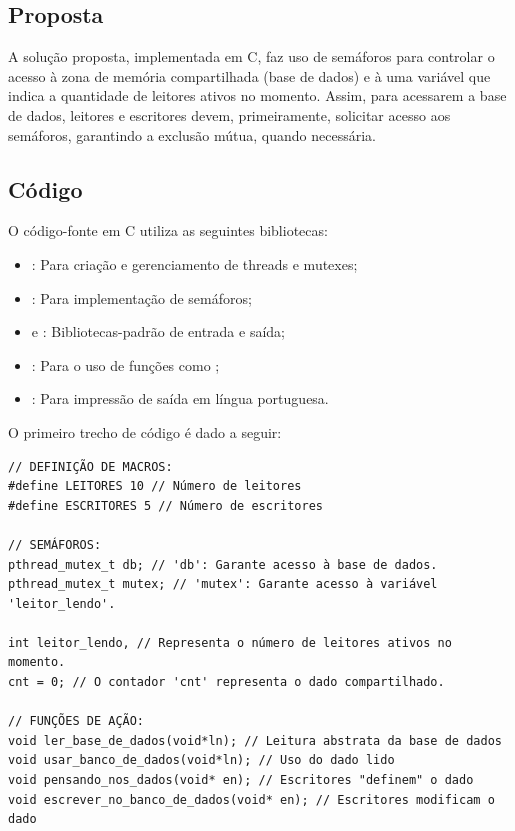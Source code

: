 \documentclass[
	12pt,				%
	openright,			%
	oneside,			%
	a4paper,			%
	chapter=TITLE,		%
	english,			%
	french,				%
	spanish,			%
	brazil				%
	]{abntex2}
\theoremstyle{definition}
\begin{document}
\subsection{Proposta} 

A solução proposta, implementada em C, faz uso de semáforos para controlar o acesso à zona de memória compartilhada (base de dados) e à uma variável que indica a quantidade de leitores ativos no momento. Assim, para acessarem a base de dados, leitores e escritores devem, primeiramente, solicitar acesso aos semáforos, garantindo a exclusão mútua, quando necessária.

\subsection{Código}

O código-fonte em C utiliza as seguintes bibliotecas:
\begin{itemize}
    \item \textbf{}: Para criação e gerenciamento de threads e mutexes;
    \item \textbf{}: Para implementação de semáforos;
    \item \textbf{} e \textbf{}: Bibliotecas-padrão de entrada e saída;
    \item \textbf{}: Para o uso de funções como ;
    \item \textbf{}: Para impressão de saída em língua portuguesa.
\end{itemize}

O primeiro trecho de código é dado a seguir:

\begin{verbatim}
// DEFINIÇÃO DE MACROS:
#define LEITORES 10 // Número de leitores
#define ESCRITORES 5 // Número de escritores

// SEMÁFOROS:
pthread_mutex_t db; // 'db': Garante acesso à base de dados.
pthread_mutex_t mutex; // 'mutex': Garante acesso à variável 'leitor_lendo'.

int leitor_lendo, // Representa o número de leitores ativos no momento.
cnt = 0; // O contador 'cnt' representa o dado compartilhado.

// FUNÇÕES DE AÇÃO:
void ler_base_de_dados(void*ln); // Leitura abstrata da base de dados
void usar_banco_de_dados(void*ln); // Uso do dado lido
void pensando_nos_dados(void* en); // Escritores "definem" o dado
void escrever_no_banco_de_dados(void* en); // Escritores modificam o dado
\end{verbatim}
\end{document}
